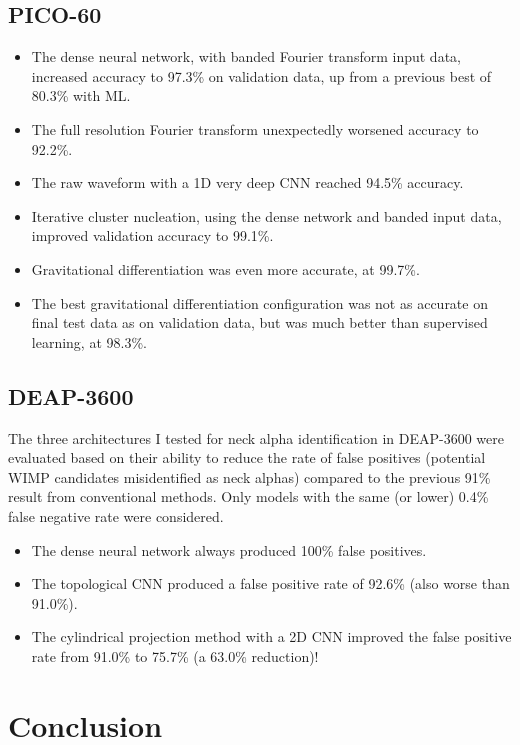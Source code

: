 \documentclass[12pt]{article}
\begin{document}
\subsection{PICO-60}

\begin{itemize}
    \item The dense neural network, with banded Fourier transform input data, increased accuracy to 97.3\% on validation data, up from a previous best of 80.3\% with ML.
    \item The full resolution Fourier transform unexpectedly worsened accuracy to 92.2\%.
    \item The raw waveform with a 1D very deep CNN reached 94.5\% accuracy.
    \item Iterative cluster nucleation, using the dense network and banded input data, improved validation accuracy to 99.1\%.
    \item Gravitational differentiation was even more accurate, at 99.7\%.
    \item The best gravitational differentiation configuration was not as accurate on final test data as on validation data, but was much better than supervised learning, at 98.3\%.
\end{itemize}

\subsection{DEAP-3600}

The three architectures I tested for neck alpha identification in DEAP-3600 were evaluated based on their ability to reduce the rate of false positives (potential WIMP candidates misidentified as neck alphas) compared to the previous 91\% result from conventional methods. Only models with the same (or lower) 0.4\% false negative rate were considered.

\begin{itemize}
    \item The dense neural network always produced 100\% false positives.
    \item The topological CNN produced a false positive rate of 92.6\% (also worse than 91.0\%).
    \item The cylindrical projection method with a 2D CNN improved the false positive rate from 91.0\% to 75.7\% (a 63.0\% reduction)!
\end{itemize}

\section{Conclusion}
\end{document}

